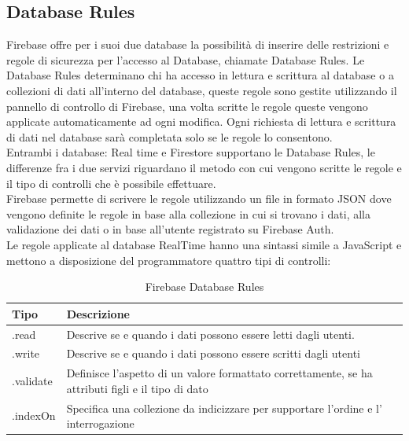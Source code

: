 \subsection{Database Rules}                 %
Firebase offre per i suoi due database la possibilità di inserire delle restrizioni e regole di sicurezza per l'accesso al Database, chiamate Database Rules. Le Database Rules determinano chi ha accesso in lettura e scrittura al database o a collezioni di dati all'interno del database, queste regole sono gestite utilizzando il pannello di controllo di Firebase, una volta scritte le regole queste vengono applicate automaticamente ad ogni modifica. Ogni richiesta di lettura e scrittura di dati nel database sarà completata solo se le regole lo consentono.\\
Entrambi i database: Real time e Firestore supportano le Database Rules, le differenze fra i due servizi riguardano il metodo con cui vengono scritte le regole e il tipo di controlli che è possibile effettuare.\\
Firebase permette di scrivere le regole utilizzando un file in formato JSON dove vengono definite le regole in base alla collezione in cui si trovano i dati, alla validazione dei dati o in base all'utente registrato su Firebase Auth.\\
Le regole applicate al database RealTime hanno una sintassi simile a JavaScript e mettono a disposizione del programmatore quattro tipi di controlli:

\begin{table}[h]
\begin{center}
\begin{tabular}{|p{2cm}|p{12cm}|}
    \hline
    {\textbf{Tipo}} & {\textbf{Descrizione}} \\ \hline
    .read & Descrive se e quando i dati possono essere letti dagli utenti.\\ \hline
    .write & Descrive se e quando i dati possono essere scritti dagli utenti\\ \hline
     .validate & Definisce l'aspetto di un valore formattato correttamente, se ha attributi figli e il tipo di dato\\ \hline
    .indexOn & Specifica una collezione da indicizzare per supportare l'ordine e l' interrogazione\\ \hline
\end{tabular}
\caption[Firbase Rules ]{Firebase Database Rules}\label{tab:Firebase Database Rules}
\end{center}
\end{table}

